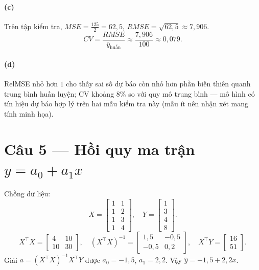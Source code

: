 \paragraph{(c)} Trên tập kiểm tra, $MSE=\frac{125}{2}=62{,}5$, $RMSE=\sqrt{62{,}5}\approx 7{,}906$.
\[
CV=\frac{RMSE}{\bar y_{\text{huấn}}}\approx \frac{7{,}906}{100}\approx 0{,}079.
\]

\paragraph{(d)} RelMSE nhỏ hơn $1$ cho thấy sai số dự báo còn nhỏ hơn phần biến thiên quanh trung bình huấn luyện; CV khoảng $8\%$ so với quy mô trung bình — mô hình có tín hiệu dự báo hợp lý trên hai mẫu kiểm tra này (mẫu ít nên nhận xét mang tính minh họa).

\section*{Câu 5 --- Hồi quy ma trận $y=a_0+a_1x$}
Chồng dữ liệu:
\[
X=\begin{bmatrix}1&1\\1&2\\1&3\\1&4\end{bmatrix},\quad
Y=\begin{bmatrix}1\\3\\4\\8\end{bmatrix}.
\]
\[
X^\top X=\begin{bmatrix}4&10\\10&30\end{bmatrix},\quad
(X^\top X)^{-1}=\begin{bmatrix}1{,}5&-0{,}5\\-0{,}5&0{,}2\end{bmatrix},\quad
X^\top Y=\begin{bmatrix}16\\51\end{bmatrix}.
\]
Giải $a=(X^\top X)^{-1}X^\top Y$ được $a_0=-1{,}5$, $a_1=2{,}2$. Vậy $\hat y=-1{,}5+2{,}2x$.

